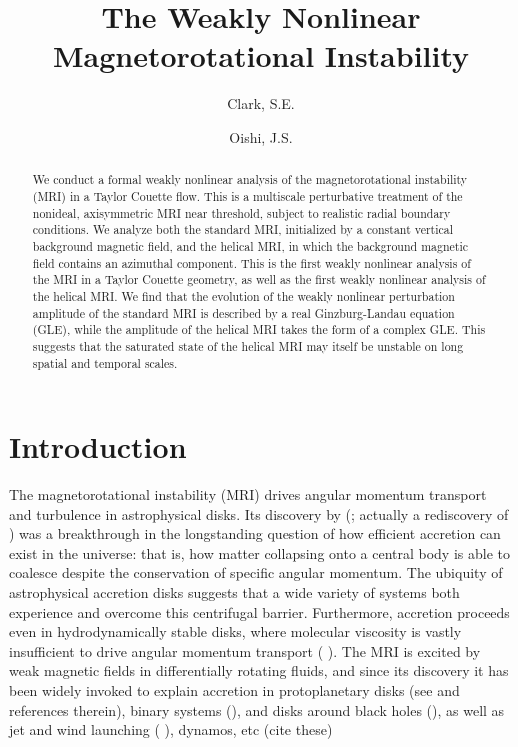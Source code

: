 \documentclass{emulateapj}
\newcommand{\citei}[1]{\citeauthor{#1} \citeyear{#1}}
\begin{document}
\title{The Weakly Nonlinear Magnetorotational Instability} %
\author{Clark, S.E.}
\author{Oishi, J.S. }


\begin{abstract}
We conduct a formal weakly nonlinear analysis of the magnetorotational instability (MRI) in a Taylor Couette flow. This is a multiscale perturbative treatment of the nonideal, axisymmetric MRI near threshold, subject to realistic radial boundary conditions. We analyze both the standard MRI, initialized by a constant vertical background magnetic field, and the helical MRI, in which the background magnetic field contains an azimuthal component. This is the first weakly nonlinear analysis of the MRI in a Taylor Couette geometry, as well as the first weakly nonlinear analysis of the helical MRI. We find that the evolution of the weakly nonlinear perturbation amplitude of the standard MRI is described by a real Ginzburg-Landau equation (GLE), while the amplitude of the helical MRI takes the form of a complex GLE. This suggests that the saturated state of the helical MRI may itself be unstable on long spatial and temporal scales.  
\end{abstract}

\section{Introduction}

The magnetorotational instability (MRI) drives angular momentum transport and turbulence in astrophysical disks. Its discovery by \citeauthor{Balbus:1991vs} (\citeyear{Balbus:1991vs}; actually a rediscovery of \citei{Chandrasekhar:1960wh}) was a breakthrough in the longstanding question of how efficient accretion can exist in the universe: that is, how matter collapsing onto a central body is able to coalesce despite the conservation of specific angular momentum. %
The ubiquity of astrophysical accretion disks suggests that a wide variety of systems both experience and overcome this centrifugal barrier. Furthermore, accretion proceeds even in hydrodynamically stable disks, where molecular viscosity is vastly insufficient to drive angular momentum transport (\citei{Shakura:1973wg}). The MRI is excited by weak magnetic fields in differentially rotating fluids, and since its discovery it has been widely invoked to explain accretion in protoplanetary disks (see \citei{Armitage:2010} and references therein), binary systems (), and disks around black holes (), as well as jet and wind launching (\citei{Lesur:2013}), dynamos, etc (cite these)
\end{document}
